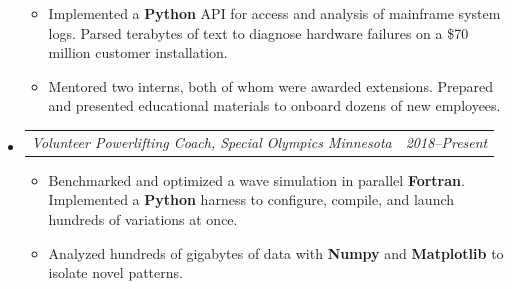 \documentclass[12pt,letterpaper]{article}
\makeatletter
\newcommand{\headerpair}[2]{
    \begin{tabular*}{\linewidth}{l@{ \extracolsep{\fill} }r} {\large\emph{#1}} & {\large\emph{#2}}
    \end{tabular*}
}
\newcommand{\headerrow}[3]{\headerpair{#1, #2}{#3}}
\newcommand{\YearRange}[2]{#1--#2}
\newcommand{\CPP}{C\nolinebreak[4]\hspace{-.05em}\raisebox{.22ex}{\footnotesize\bf ++}\xspace}
\makeatother
\begin{document}
\begin{itemize}[leftmargin=\parindent]
\begin{itemize}[leftmargin=\parindent]
            \item Implemented a \textbf{Python} API for access and analysis of mainframe system logs. Parsed terabytes of text to diagnose hardware failures on a \$70 million customer installation.
            \item Mentored two interns, both of whom were awarded extensions. Prepared and presented educational materials to onboard dozens of new employees.

        \end{itemize}

    \item[]
        \headerrow
            {Volunteer Powerlifting Coach}
            {Special Olympics Minnesota}
            {\YearRange{2018}{Present}}
        \begin{itemize}[leftmargin=\parindent]
            \item Benchmarked and optimized a wave simulation in parallel \textbf{Fortran}. Implemented a \textbf{Python} harness to configure, compile, and launch hundreds of variations at once.
            \item Analyzed hundreds of gigabytes of data with \textbf{Numpy} and \textbf{Matplotlib} to isolate novel patterns.
        \end{itemize}



\end{itemize}
\end{document}
